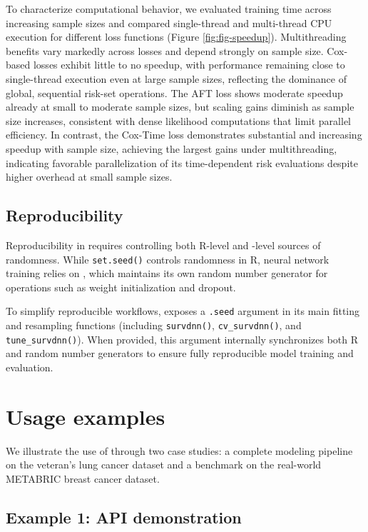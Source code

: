 To characterize computational behavior, we evaluated training time across increasing sample sizes and compared single-thread and multi-thread CPU execution for different loss functions (Figure \ref{fig:fig-speedup}). Multithreading benefits vary markedly across losses and depend strongly on sample size. Cox-based losses exhibit little to no speedup, with performance remaining close to single-thread execution even at large sample sizes, reflecting the dominance of global, sequential risk-set operations. The AFT loss shows moderate speedup already at small to moderate sample sizes, but scaling gains diminish as sample size increases, consistent with dense likelihood computations that limit parallel efficiency. In contrast, the Cox-Time loss demonstrates substantial and increasing speedup with sample size, achieving the largest gains under multithreading, indicating favorable parallelization of its time-dependent risk evaluations despite higher overhead at small sample sizes.

\subsection{Reproducibility}\label{reproducibility}

Reproducibility in  requires controlling both R-level and -level sources of randomness. While \texttt{set.seed()} controls randomness in R, neural network training relies on , which maintains its own random number generator for operations such as weight initialization and dropout.

To simplify reproducible workflows,  exposes a \texttt{.seed} argument in its main fitting and resampling functions (including \texttt{survdnn()}, \texttt{cv\_survdnn()}, and \texttt{tune\_survdnn()}). When provided, this argument internally synchronizes both R and  random number generators to ensure fully reproducible model training and evaluation.

\section{Usage examples}\label{usage-examples}

We illustrate the use of  through two case studies: a complete modeling pipeline on the veteran's lung cancer dataset and a benchmark on the real-world METABRIC breast cancer dataset.

\subsection{Example 1: API demonstration}\label{example-1-api-demonstration}

